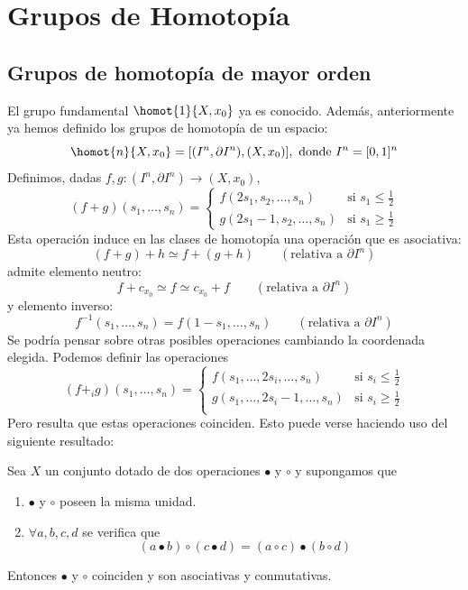 \chapter{Grupos de Homotopía}
\section{Grupos de homotopía de mayor orden}
El grupo fundamental $\homot{1}{X, x_0}$ ya es conocido. Además, anteriormente ya hemos definido los grupos de homotopía de un espacio:
\[ \homot{n}{X, x_0} = [(I^n, \partial I^n), (X, x_0)], \text{ donde } I^n = [0,1]^n \]
Definimos, dadas $f,g : (I^n, \partial I^n) \longrightarrow (X, x_0)$,
\[
(f + g)(s_1, \ldots, s_n) = 
\begin{cases}
f(2s_1, s_2, \ldots, s_n) & \text{si } s_1 \leq \frac{1}{2} \\
g(2s_1 - 1, s_2, \ldots, s_n) & \text{si } s_1 \geq \frac{1}{2}
\end{cases}
\]
Esta operación induce en las clases de homotopía una operación que es asociativa:
\[
(f + g) + h \simeq f + (g + h) \qquad (\text{relativa a } \partial I^n)
\]
admite elemento neutro:
\[
f + c_{x_0} \simeq f \simeq c_{x_0} + f \qquad (\text{relativa a } \partial I^n)
\]
y elemento inverso:
\[
f^{-1} (s_1, \ldots, s_n) = f(1 - s_1, \ldots, s_n) \qquad (\text{relativa a } \partial I^n)
\]
Se podría pensar sobre otras posibles operaciones cambiando la coordenada elegida. Podemos definir las operaciones
\[
(f +_i g)(s_1, \ldots, s_n) = 
\begin{cases}
f(s_1, \ldots, 2s_i, \ldots, s_n) & \text{si } s_i \leq \frac{1}{2} \\
g(s_1, \ldots, 2s_i -1, \ldots, s_n) & \text{si } s_i \geq \frac{1}{2} \\
\end{cases}
\]
Pero resulta que estas operaciones coinciden. Esto puede verse haciendo uso del siguiente resultado:
\begin{prop}
Sea $X$ un conjunto dotado de dos operaciones $\bullet$ y $\circ$ y supongamos que 
\begin{enumerate}
\item $\bullet$ y $\circ$ poseen la misma unidad.
\item $\forall a,b,c,d$ se verifica que
\[
(a \bullet b) \circ (c \bullet d) = (a \circ c) \bullet (b \circ d) 
\]
\end{enumerate}
Entonces $\bullet$ y $\circ$ coinciden y son asociativas y conmutativas.
\end{prop}
